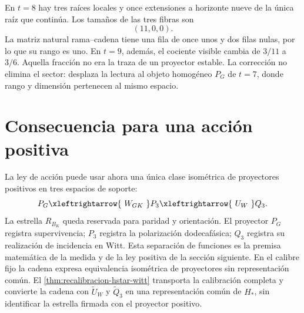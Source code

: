 En \(t=8\) hay tres raíces locales y once extensiones a horizonte nueve de
la única raíz que continúa. Los tamaños de las tres fibras son
\[
 (11,0,0).
\]
La matriz natural rama--cadena tiene una fila de once unos y dos filas
nulas, por lo que su rango es uno. En \(t=9\), además, el cociente visible
cambia de \(3/11\) a \(3/6\). Aquella fracción no era la traza de un
proyector estable. La corrección no elimina el sector: desplaza la lectura
al objeto homogéneo \(P_G\) de \(t=7\), donde rango y dimensión
pertenecen al mismo espacio.

\section{Consecuencia para una acción positiva}

La ley de acción puede usar ahora una única clase isométrica de proyectores
positivos en tres espacios de soporte:
\[
 P_G
 \xleftrightarrow{\ W_{GK}\ }
 P_3
 \xleftrightarrow{\ U_W\ }
 Q_3.
\]
La estrella \(R_{B_K}\) queda reservada para paridad y orientación. El
proyector \(P_G\) registra supervivencia; \(P_3\) registra la polarización
dodecafásica; \(Q_3\) registra su realización de incidencia en Witt. Esta
separación de funciones es la premisa matemática de la medida y de la ley
positiva de la sección siguiente. En el calibre fijo la cadena expresa
equivalencia isométrica de proyectores sin representación común. El
\cref{thm:recalibracion-hstar-witt} transporta la calibración completa y
convierte la cadena con \(\widetilde U_W\) y \(\widetilde Q_3\) en una
representación común de \(H_*\), sin identificar la estrella firmada con el
proyector positivo.
